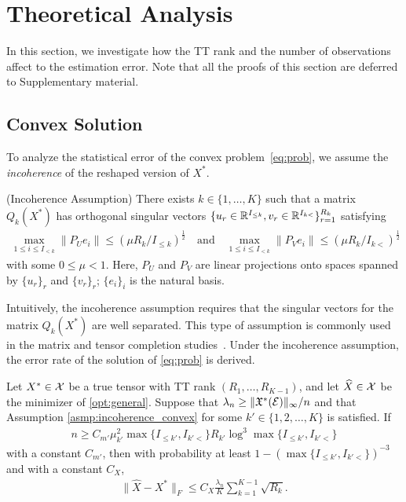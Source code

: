 
\section{Theoretical Analysis}

In this section, we investigate how the TT rank and the number of
observations affect to the estimation error. Note that all the proofs
of this section are deferred to Supplementary material.


\subsection{Convex Solution}

To analyze the statistical error of the convex problem~\eqref{eq:prob}, we assume the
\textit{incoherence} of the reshaped version of $X^*$.
\begin{assumption}{(Incoherence Assumption)}\label{asmp:incoherence_convex}
There exists $k \in \{1,\ldots,K\}$ such that a matrix $Q_k(X^*)$ has orthogonal singular vectors $\{ u_r \in \mathbb{R}^{I_{\leq k}}, v_r \in  \mathbb{R}^{I_{k<}}\}_{r = 1}^{R_k}$ satisfying
	\begin{align*}
          \max_{1 \leq i \leq I_{<k}}\|P_{U}e_{i}\| \leq ( \mu R_k / I_{\leq k})^{\frac{1}{2}}
          \quad \text{and} \quad
          \max_{1 \leq i \leq I_{<k}}\|P_{V}e_{i}\| \leq ( \mu R_k / I_{k<})^{\frac{1}{2}}
	\end{align*}
	with some $0 \leq \mu < 1$.
	Here, $P_U$ and $P_V$ are linear projections onto spaces spanned by $\{u_r\}_r$ and $\{v_r\}_r$; $\{e_i\}_i$ is the natural basis.
\end{assumption}
Intuitively, the incoherence assumption requires that the singular
vectors for the matrix $Q_k(X^*)$ are well separated.
This type of assumption is commonly used in the matrix and tensor
completion studies~\cite{candes2012exact,candes2010matrix,
  zhang2016exact}.
%
Under the incoherence assumption, the error rate of the solution of \eqref{eq:prob} is derived.
\begin{theorem} \label{thm:convex} Let
  $X^*\in\mathcal{X}$ be a true tensor with TT rank $(R_1,\dots,R_{K-1})$, and let
  $\widehat{X}\in\mathcal{X}$ be the minimizer of \eqref{opt:general}.  Suppose that
  $\lambda_n \geq \|\mathfrak{X}^*(\mathcal{E})\|_{\infty}/n$ and that Assumption
  \ref{asmp:incoherence_convex} for some $k' \in \{1,2,\ldots,K\}$ is
  satisfied.  If
	\begin{align*}
		n \geq C_{m'} \mu_{k'}^2 \max\{I_{\leq k'}, I_{k'<}\} R_{k'} \log^3  \max\{I_{\leq k'}, I_{k'<}\}
	\end{align*}
	with a constant $C_{m'}$, then with probability at least $1-( \max\{I_{\leq k'}, I_{k'<}\})^{-3}$ and with a constant $C_X$,
	\begin{align*}
		\|\hat{X} - X^*\|_F \leq  C_{X} \frac{\lambda_n}{K}\sum_{k=1}^{K-1} \sqrt{R_k }.
	\end{align*}
\end{theorem}

